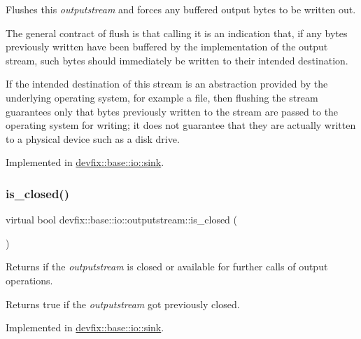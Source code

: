 Flushes this {\itshape outputstream} and forces any buffered output bytes to be written out. 

The general contract of flush is that calling it is an indication that, if any bytes previously written have been buffered by the implementation of the output stream, such bytes should immediately be written to their intended destination.

If the intended destination of this stream is an abstraction provided by the underlying operating system, for example a file, then flushing the stream guarantees only that bytes previously written to the stream are passed to the operating system for writing; it does not guarantee that they are actually written to a physical device such as a disk drive. 

Implemented in \hyperlink{structdevfix_1_1base_1_1io_1_1sink_abf208747c9be8295972fbc4696ddc557}{devfix\+::base\+::io\+::sink}.

\mbox{\label{structdevfix_1_1base_1_1io_1_1outputstream_a52bd2eac8f6fbc496eab5138a48d2f06}} 
\subsubsection{\texorpdfstring{is\+\_\+closed()}{is\_closed()}}
{\footnotesize\ttfamily virtual bool devfix\+::base\+::io\+::outputstream\+::is\+\_\+closed (\begin{DoxyParamCaption}{ }\end{DoxyParamCaption})\hspace{0.3cm}{\ttfamily [pure virtual]}}



Returns if the {\itshape outputstream} is closed or available for further calls of output operations. 

\begin{DoxyReturn}{Returns}
true if the {\itshape outputstream} got previously closed. 
\end{DoxyReturn}


Implemented in \hyperlink{structdevfix_1_1base_1_1io_1_1sink_a1e5782219f9256d8ff09385fa6f3b156}{devfix\+::base\+::io\+::sink}.

\mbox{\label{structdevfix_1_1base_1_1io_1_1outputstream_ac7e5fcd6883c7c8f53356a4eb8284c00}} 

